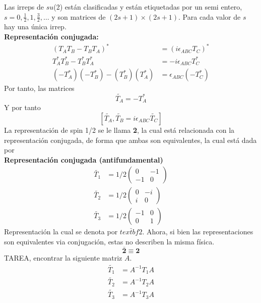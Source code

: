 \documentclass[../main.tex]{subfiles}
\begin{document}
Las irreps de $su$(2) están clasificadas y están etiquetadas por un semi entero, $s=0,\frac{1}{2}, 1 , \frac{3}{2},\dots$ y son matrices de $(2s+1)\times (2s+1)$. Para cada valor de $s$ hay una única irrep. \\
\textbf{Representación conjugada:}
\begin{align*}
  (T_AT_B - T_BT_A)^* & = (i\epsilon_{ABC}T_C)^* \\
  T_A^*T_B^*-T_B^*T_A^* & = -i\epsilon_{ABC}T_C^* \\
  (-T_A^*)(-T_B^*) - (T_B^*)(T_A^*) & = \epsilon_{ABC}(-T_C^*)
\end{align*}
Por tanto, las matrices 
\begin{equation*}
  \tilde{T_A} = -T_A^*
\end{equation*}
Y por tanto
\begin{equation*}
  \left[\tilde{T_A},\tilde{T_B} = i\epsilon_{ABC}\tilde{T_C}\right]
\end{equation*}
La representación de spin 1/2 se le llama \textbf{2}, la cual está relacionada con la representación conjugada, de forma que ambas son equivalentes, la cual está dada por\\
\textbf{Representación conjugada (antifundamental)}
\begin{align*}
  \tilde{T_1} & = 1/2\begin{pmatrix} 0 & -1 \\ -1 & 0 \end{pmatrix} \\
  \tilde{T_2} & = 1/2\begin{pmatrix} 0 & -i \\ i & 0 \end{pmatrix}\\
    \tilde{T_3} & = 1/2 \begin{pmatrix} -1 & 0 \\ 0 & 1 \end{pmatrix}
\end{align*}
Representación la cual se denota por $\bar{textbf{2}}$. Ahora, si bien las representaciones son equivalentes via conjugación, estas no describen la misma física.
\begin{equation*}
  \bar{\textbf{2}} \equiv \textbf{2}
\end{equation*}
TAREA, encontrar la siguiente matriz $A$. 
\begin{align*}
  \tilde{T_1} & = A^{-1}T_1A \\
  \tilde{T_2} & = A^{-1}T_2A \\
  \tilde{T_3} & = A^{-1}T_3A
\end{align*}
\end{document}
